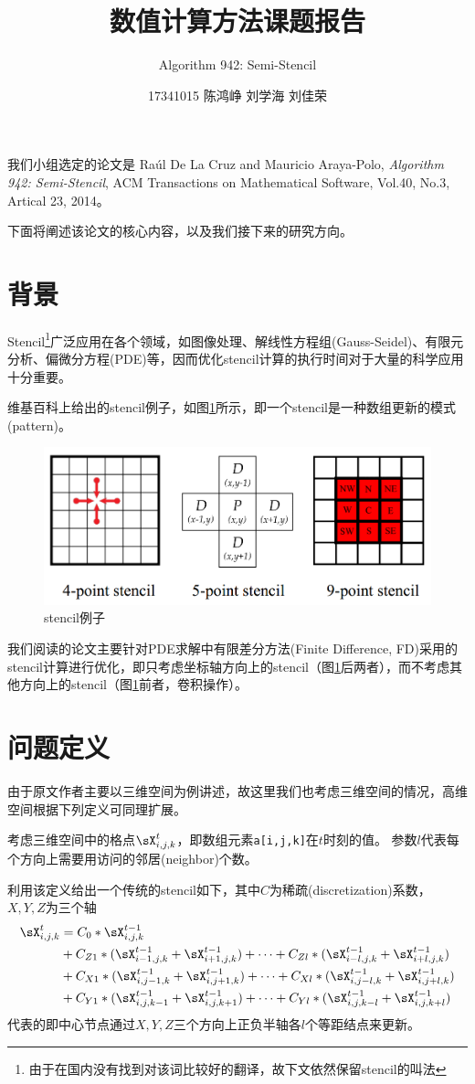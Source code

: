 \documentclass[reportComp,bib]{thesis}
\title{数值计算方法课题报告}
\subtitle{Algorithm 942: Semi-Stencil}
\author{17341015 陈鸿峥\quad17341111 刘学海\quad17341109 刘佳荣}
\begin{document}
\maketitle

我们小组选定的论文是
Ra\'ul De La Cruz and Mauricio Araya-Polo, \emph{Algorithm 942: Semi-Stencil}, ACM Transactions on Mathematical Software, Vol.40, No.3, Artical 23, 2014。

下面将阐述该论文的核心内容，以及我们接下来的研究方向。

\section{背景}
\label{sec:bg}
Stencil\footnote{由于在国内没有找到对该词比较好的翻译，故下文依然保留stencil的叫法}广泛应用在各个领域，如图像处理\cite{kernel}、解线性方程组(Gauss-Seidel\cite{gauss-seidel})、有限元分析\cite{fem}、偏微分方程(PDE)\cite{pde}等，因而优化stencil计算的执行时间对于大量的科学应用十分重要。

维基百科上给出的stencil例子\cite{stencil}，如图\ref{fig:stencil_example}所示，即一个stencil是一种数组更新的模式(pattern)。
\begin{figure}[H]
\centering
\includegraphics[width=0.6\linewidth]{fig/stencil-example.PNG}
\caption{stencil例子}
\label{fig:stencil_example}
\end{figure}

我们阅读的论文主要针对PDE求解中有限差分方法(Finite Difference, FD)采用的stencil计算进行优化，即只考虑坐标轴方向上的stencil（图\ref{fig:stencil_example}后两者），而不考虑其他方向上的stencil（图\ref{fig:stencil_example}前者，卷积操作）。

\section{问题定义}
\label{sec:problem}
由于原文作者主要以三维空间为例讲述，故这里我们也考虑三维空间的情况，高维空间根据下列定义可同理扩展。

考虑三维空间中的格点$\sX_{i,j,k}^t$，即数组元素\verb'a[i,j,k]'在$t$时刻的值。
参数$l$代表每个方向上需要用访问的邻居(neighbor)个数。

利用该定义给出一个传统的stencil如下，其中$C$为稀疏(discretization)系数，$X,Y,Z$为三个轴
\[\begin{aligned}
\sX_{i,j,k}^t &= C_0*\sX_{i,j,k}^{t-1}\\
&+C_{Z1}*(\sX_{i-1,j,k}^{t-1}+\sX_{i+1,j,k}^{t-1})+\cdots+C_{Zl}*(\sX_{i-l,j,k}^{t-1}+\sX_{i+l,j,k}^{t-1})\\
&+C_{X1}*(\sX_{i,j-1,k}^{t-1}+\sX_{i,j+1,k}^{t-1})+\cdots+C_{Xl}*(\sX_{i,j-l,k}^{t-1}+\sX_{i,j+l,k}^{t-1})\\
&+C_{Y1}*(\sX_{i,j,k-1}^{t-1}+\sX_{i,j,k+1}^{t-1})+\cdots+C_{Yl}*(\sX_{i,j,k-l}^{t-1}+\sX_{i,j,k+l}^{t-1})
\end{aligned}\]
代表的即中心节点通过$X,Y,Z$三个方向上正负半轴各$l$个等距结点来更新。
\end{document}

